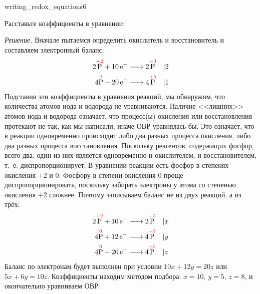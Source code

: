 \begin{example}{}{writing_redox_equations6}
    \begin{condition}
        Расставьте коэффициенты в уравнении:
    \end{condition}

    \medskip

    \textit{Решение.} Вначале пытаемся определить окислитель и восстановитель и составляем электронный баланс:
    \begin{align*}
        2\overset{\textcolor{red}{+2}}{\ce{P}} + \ce{10e- ->} 2\overset{\textcolor{red}{-3}}{\ce{P}} \quad &| 2 \\
        4\overset{\textcolor{red}{0}}{\ce{P}} - \ce{20e- ->} 4\overset{\textcolor{red}{+5}}{\ce{P}} \quad &| 1
    \end{align*}
    Подставив эти коэффициенты в уравнения реакций, мы обнаружим, что количества атомов иода и водорода не уравниваются. Наличие <<лишних>> атомов иода и водорода означает, что процесс(ы) окисления или восстановления протекают не так, как мы написали, иначе ОВР уравнялась бы. Это означает, что в реакции одновременно происходит либо два разных процесса окисления, либо два разных процесса восстановления. Поскольку реагентов, содержащих фосфор, всего два, один из них является одновременно и окислителем, и восстановителем, т.~е. диспропорционирует. В уравнении реакции есть фосфор в степенях окисления $+2$ и 0. Фосфору в степени окисления 0 проще диспропорционировать, поскольку забирать электроны у атома со степенью окисления $+2$ сложнее. Поэтому записываем баланс не из двух реакций, а из трёх:
    \begin{align*}
        2\overset{\textcolor{red}{+2}}{\ce{P}} + \ce{10e- ->} 2\overset{\textcolor{red}{-3}}{\ce{P}} \quad &| x \\
        4\overset{\textcolor{red}{0}}{\ce{P}} + \ce{12e- ->} 4\overset{\textcolor{red}{-3}}{\ce{P}} \quad &| y \\
        4\overset{\textcolor{red}{0}}{\ce{P}} - \ce{20e- ->} 4\overset{\textcolor{red}{+5}}{\ce{P}} \quad &| z
    \end{align*}
    Баланс по электронам будет выполнен при условии $10x + 12y = 20z$ или $5x + 6y = 10z$. Коэффициенты находим методом подбора: $x = 10$, $y = 5$, $z = 8$, и окончательно уравниваем ОВР:
\end{example}

